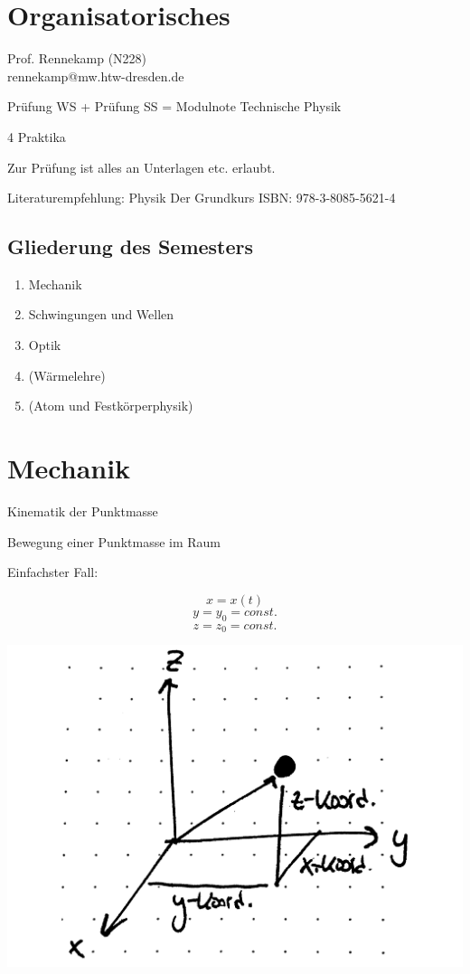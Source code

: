 \section{Organisatorisches}

Prof. Rennekamp (N228)\\
rennekamp@mw.htw-dresden.de

Prüfung WS + Prüfung SS = Modulnote Technische Physik

4 Praktika

Zur Prüfung ist alles an Unterlagen etc. erlaubt.

Literaturempfehlung: Physik Der Grundkurs ISBN: 978-3-8085-5621-4

\subsection{Gliederung des Semesters}
\begin{enumerate}
	\item Mechanik
	\item Schwingungen und Wellen
	\item Optik
	\item (Wärmelehre)
	\item (Atom und Festkörperphysik)
\end{enumerate}

\section{Mechanik}

Kinematik der Punktmasse

Bewegung einer Punktmasse im Raum

Einfachster Fall:

\begin{minipage}{.5\textwidth}
		$$x = x(t)$$
		$$y = y_0 = const.$$
		$$z = z_0 = const.$$
\end{minipage} \hfill
\begin{minipage}{.45\textwidth}
	\includegraphics[width=\textwidth]{img/1_1}
\end{minipage}

